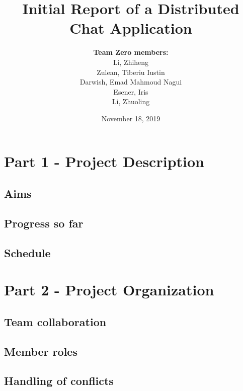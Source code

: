 \documentclass[11pt,openright,a4paper]{article}
\title{\textbf{Initial Report of a Distributed Chat Application}}
\author{\textbf{Team Zero members:} \\
		Li, Zhiheng  
		\\Zulean, Tiberiu Iustin 
		\\Darwish, Emad Mahmoud Nagui 
		\\ Esener, Iris
		\\ Li, Zhuoling
}
\date{November 18, 2019}
\begin{document}


\maketitle

\setcounter{page}{1}

\section*{Part 1 - Project Description}
\addtocounter{section}{1}
\label{part1}


\subsection{Aims}
\label{aims}



\subsection{Progress so far}
\label{progress}



\subsection{Schedule}
\label{schedule}



\section*{Part 2 - Project Organization}
\addtocounter{section}{1}
\label{part2}


\subsection{Team collaboration}
\label{collaboration}



\subsection{Member roles}
\label{roles}



\subsection{Handling of conflicts}
\label{conflicts}


\end{document}
